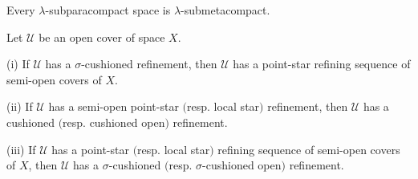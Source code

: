 \documentclass[main.tex]{subfiles}
\begin{document}
{\corollary{} \label{cor:4.1.8}
Every $\lambda$-subparacompact space is $\lambda$-submetacompact. \hfill\qedsymbol
}

{\theorem{} \label{th:4.1.9}
Let $\mathscr{U}$ be an open cover of space $X$.

\textup{(i)} If $\mathscr{U}$ has a $\sigma$-cushioned refinement, then $\mathscr{U}$ has a point-star 
refining sequence of semi-open covers of $X$.

\textup{(ii)} If $\mathscr{U}$ has a semi-open point-star $($resp. local star$)$ refinement, then 
$\mathscr{U}$ has a cushioned $($resp. cushioned open$)$ refinement.

\textup{(iii)}  If $\mathscr{U}$ has a point-star $($resp. local star$)$ refining sequence of semi-open 
covers of $X$, then $\mathscr{U}$ has a $\sigma$-cushioned 
$($resp. $\sigma$-cushioned open$)$ refinement.
}
\end{document}
